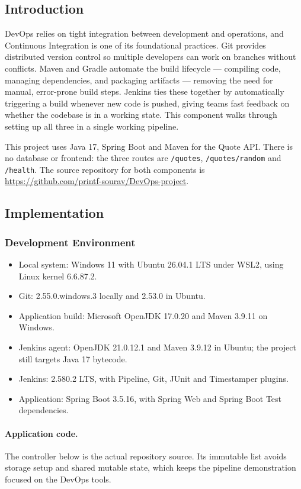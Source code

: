 \documentclass[12pt,a4paper]{article}
\begin{document}
\subsection*{Introduction}
DevOps relies on tight integration between development and operations, and Continuous Integration is one of its foundational practices. Git provides distributed version control so multiple developers can work on branches without conflicts. Maven and Gradle automate the build lifecycle --- compiling code, managing dependencies, and packaging artifacts --- removing the need for manual, error-prone build steps. Jenkins ties these together by automatically triggering a build whenever new code is pushed, giving teams fast feedback on whether the codebase is in a working state. This component walks through setting up all three in a single working pipeline.

This project uses Java 17, Spring Boot and Maven for the Quote API. There is no database or frontend: the three routes are \texttt{/quotes}, \texttt{/quotes/random} and \texttt{/health}. The source repository for both components is \url{https://github.com/printf-sourav/DevOps-project}.

\subsection*{Implementation}
\subsubsection*{Development Environment}
\begin{itemize}[nosep]
\item Local system: Windows 11 with Ubuntu 26.04.1 LTS under WSL2, using Linux kernel 6.6.87.2.
\item Git: 2.55.0.windows.3 locally and 2.53.0 in Ubuntu.
\item Application build: Microsoft OpenJDK 17.0.20 and Maven 3.9.11 on Windows.
\item Jenkins agent: OpenJDK 21.0.12.1 and Maven 3.9.12 in Ubuntu; the project still targets Java 17 bytecode.
\item Jenkins: 2.580.2 LTS, with Pipeline, Git, JUnit and Timestamper plugins.
\item Application: Spring Boot 3.5.16, with Spring Web and Spring Boot Test dependencies.
\end{itemize}

\paragraph{Application code.}
The controller below is the actual repository source. Its immutable list avoids storage setup and shared mutable state, which keeps the pipeline demonstration focused on the DevOps tools.
\end{document}
